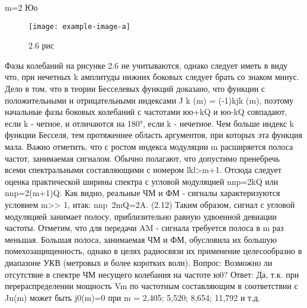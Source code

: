 ﻿\documentclass[a4paper,12pt]{article}
\begin{document}
m=2	Юо	

\begin{figure}[H]
	\centering
	\texttt{[image: example-image-a]}
	\caption{2.6 рис}
\end{figure}
Фазы колебаний на рисунке 2.6 не учитываются, однако следует иметь в виду что, при нечетных k амплитуды нижних боковых следует брать со знаком минус. Дело в том, что в теории Бесселевых функций доказано, что функции с положительными и отрицательными индексами
J k (m) = (-1)kjk (m),
поэтому начальные фазы боковых колебаний с частотами юо+kQ и юо-kQ совпадают, если k - четное, и отличаются на 180°, если k - нечетное.
Чем больше индекс k функции Бесселя, тем протяженнее область аргументов, при которых эта функция мала. Важно отметить, что с ростом индекса модуляции m расширяется полоса частот, занимаемая сигналом. Обычно полагают, что допустимо пренебречь всеми спектральными составляющими с номером lkl>m+1. Отсюда следует оценка практической ширины спектра с угловой модуляцией nnp=2kQ или nnp=2(m+1)Q.
Как видно, реальные ЧМ и ФМ - сигналы характеризуются условием m>> 1, итак:
nnp~2mQ=2A.	(2.12)
Таким образом, сигнал с угловой модуляцией занимает полосу, приблизительно равную удвоенной девиации частоты.
Отметим, что для передачи AM - сигнала требуется полоса в m раз меньшая. Большая полоса, занимаемая ЧМ и ФМ, обусловила их большую помехозащищенность, однако в целях радиосвязи их применение целесообразно в диапазоне УКВ (метровых и более коротких волн).
Вопрос: Возможно ли отсутствие в спектре ЧМ несущего колебания на частоте ю0?
Ответ: Да, т.к. при перераспределении мощность Vm по частотным составляющим в соответствии с Jn(m) может быть j0(m)=0 при m = 2,405; 5,520; 8,654; 11,792 и т.д.
\end{document}
